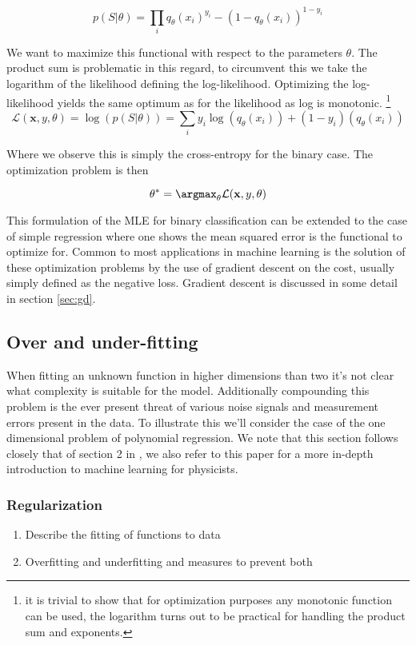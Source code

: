 \begin{equation}
p(S | \theta) = \prod_i q_\theta(x_i)^{y_i} - (1-q_\theta(x_i))^{1-y_i}
\end{equation}

\noindent We want to maximize this functional with respect to the parameters $\theta$. The product sum is problematic in this regard, to circumvent this we take the logarithm of the likelihood defining the log-likelihood. Optimizing the log-likelihood yields the same optimum as for the likelihood as log is monotonic. \footnote{it is trivial to show that for optimization purposes any monotonic function can be used, the logarithm turns out to be practical for handling the product sum and exponents.}
\begin{equation}
\mathcal{L}(\mathbf{x}, y, \theta) = \log(p(S | \theta)) = \sum_i y_i\log(q_\theta(x_i)) + (1-y_i)(q_\theta(x_i))
\end{equation}

\noindent Where we observe this is simply the cross-entropy for the binary case. The optimization problem is then 

\begin{equation}
\theta^* = \argmax_\theta \mathcal{L}(\mathbf{x}, y, \theta )
\end{equation}

\noindent This formulation of the MLE for binary classification can be extended to the case of simple regression where one shows the mean squared error is the functional to optimize for. Common to most applications in machine learning is the solution of these optimization problems by the use of gradient descent on the cost, usually simply defined as the negative loss. Gradient descent is discussed in some detail in section \ref{sec:gd}.

\subsection{Over and under-fitting}

When fitting an unknown function in higher dimensions than two it's not clear what complexity is suitable for the model. Additionally compounding this problem is the ever present threat of various noise signals and measurement errors present in the data. To illustrate this we'll consider the case of the one dimensional problem of polynomial regression. We note that this section follows closely that of section 2 in \citet{Mehta2019}, we also refer to this paper for a more in-depth introduction to machine learning for physicists. 

\subsubsection*{Regularization}

\begin{enumerate}
	\item Describe the fitting of functions to data
	\item Overfitting and underfitting and measures to prevent both
\end{enumerate}
